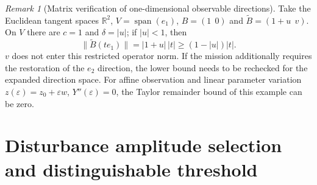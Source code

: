 \documentclass[12pt,a4paper,openany,notitlepage]{report}
\theoremstyle{plain}
\theoremstyle{definition}
\theoremstyle{remark}
\newtheorem{remark}[theorem]{Remark}
\begin{document}
\begin{CJK*}
\begin{remark}
[Matrix verification of one-dimensional observable directions]Take the Euclidean tangent spaces $\mathbb R^2$, $V=\operatorname{span}(e_1)$, $B=(1\ \ 0)$ and $\widetilde B=(1+u\ \ v)$. On $V$ there are $c=1$ and $\delta=|u|$; if $|u|<1$, then \[
\lVert\widetilde B(te_1)\rVert=|1+u|\,|t|
\ge(1-|u|)|t|.
\] $v$ does not enter this restricted operator norm. If the mission additionally requires the restoration of the $e_2$ direction, the lower bound needs to be rechecked for the expanded direction space. For affine observation and linear parameter variation $z(\varepsilon)=z_0+\varepsilon w$, $Y''(\varepsilon)=0$, the Taylor remainder bound of this example can be zero.\end{remark}


\section { Disturbance amplitude selection and distinguishable threshold }\label{exp:geo:section:amplitude}



\end{CJK*}
\end{document}

